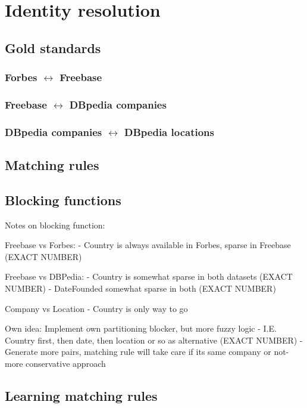 \section{Identity resolution}
\subsection{Gold standards}

\subsubsection{Forbes $\leftrightarrow$ Freebase}

\subsubsection{Freebase $\leftrightarrow$ DBpedia companies}

\subsubsection{DBpedia companies $\leftrightarrow$ DBpedia locations}


\subsection{Matching rules}

\subsection{Blocking functions}

Notes on blocking function:

Freebase vs Forbes: 
- Country is always available in Forbes, sparse in Freebase (EXACT NUMBER)

Freebase vs DBPedia:
- Country is somewhat sparse in both datasets (EXACT NUMBER)
- DateFounded somewhat sparse in both (EXACT NUMBER)

Company vs Location
- Country is only way to go

Own idea: Implement own partitioning blocker, but more fuzzy logic
- I.E. Country first, then date, then location or so as alternative (EXACT NUMBER)
- Generate more pairs, matching rule will take care if its same company or not- more conservative approach


\subsection{Learning matching rules}

